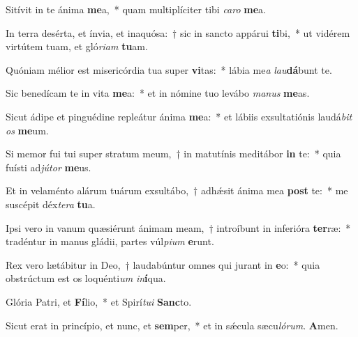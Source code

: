 Sitívit in te ánima \textbf{me}a,~* quam multiplíciter tibi \textit{ca}\textit{ro} \textbf{me}a.

In terra desérta, et ínvia, et inaquósa:~† sic in sancto appárui \textbf{ti}bi,~* ut vidérem virtútem tuam, et gló\textit{ri}\textit{am} \textbf{tu}am.

Quóniam mélior est misericórdia tua super \textbf{vi}tas:~* lábia me\textit{a} \textit{lau}\textbf{dá}bunt te.

Sic benedícam te in vita \textbf{me}a:~* et in nómine tuo levábo \textit{ma}\textit{nus} \textbf{me}as.

Sicut ádipe et pinguédine repleátur ánima \textbf{me}a:~* et lábiis exsultatiónis laudá\textit{bit} \textit{os} \textbf{me}um.

Si memor fui tui super stratum meum,~† in matutínis meditábor \textbf{in} te:~* quia fuísti ad\textit{jú}\textit{tor} \textbf{me}us.

Et in velaménto alárum tuárum exsultábo,~† adhǽsit ánima mea \textbf{post} te:~* me suscépit déx\textit{te}\textit{ra} \textbf{tu}a.

Ipsi vero in vanum quæsiérunt ánimam meam,~† introíbunt in inferióra \textbf{ter}ræ:~* tradéntur in manus gládii, partes vúl\textit{pi}\textit{um} \textbf{e}runt.

Rex vero lætábitur in Deo,~† laudabúntur omnes qui jurant in \textbf{e}o:~* quia obstrúctum est os loquénti\textit{um} \textit{in}\textbf{í}qua.

Glória Patri, et \textbf{Fí}lio,~* et Spirí\textit{tu}\textit{i} \textbf{Sanc}to.

Sicut erat in princípio, et nunc, et \textbf{sem}per,~* et in sǽcula sæcu\textit{ló}\textit{rum}. \textbf{A}men.

